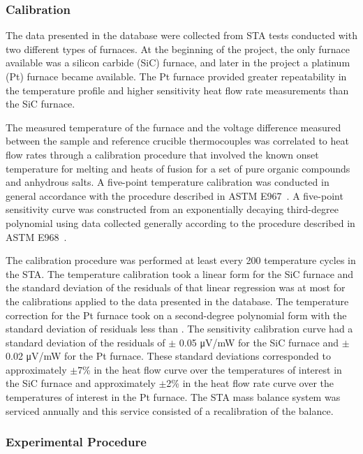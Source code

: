 \documentclass[12pt,oneside]{book}
\begin{document}
\subsubsection{Calibration}

The data presented in the database were collected from STA tests conducted with two different types of furnaces. At the beginning of the project, the only furnace available was a silicon carbide (SiC) furnace, and later in the project a platinum (Pt) furnace became available. The Pt furnace provided greater repeatability in the temperature profile and higher sensitivity heat flow rate measurements than the SiC furnace. 

The measured temperature of the furnace and the voltage difference measured between the sample and reference crucible thermocouples was correlated to heat flow rates through a calibration procedure that involved the known onset temperature for melting and heats of fusion for a set of pure organic compounds and anhydrous salts. A five-point temperature calibration was conducted in general accordance with the procedure described in ASTM E967~\cite{ASTM_E967}. A five-point sensitivity curve was constructed from an exponentially decaying third-degree polynomial using data collected generally according to the procedure described in ASTM E968~\cite{ASTM_E968}. 

The calibration procedure was performed at least every 200 temperature cycles in the STA. The temperature calibration took a linear form for the SiC furnace and the standard deviation of the residuals of that linear regression was at most  for the calibrations applied to the data presented in the database. The temperature correction for the Pt furnace took on a second-degree polynomial form with the standard deviation of residuals less than . The sensitivity calibration curve had a standard deviation of the residuals of $\pm$ 0.05 \si{\micro V/mW} for the SiC furnace and $\pm$ 0.02 \si{\micro V/mW} for the Pt furnace. These standard deviations corresponded to approximately $\pm$7\% in the heat flow curve over the temperatures of interest in the SiC furnace and approximately $\pm$2\% in the heat flow rate curve over the temperatures of interest in the Pt furnace. The STA mass balance system was serviced annually and this service consisted of a recalibration of the balance. 

\subsubsection{Experimental Procedure}
\end{document}
